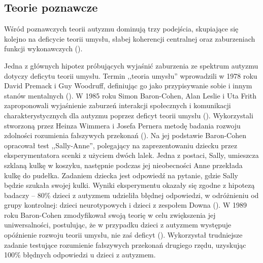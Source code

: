     \subsection{Teorie poznawcze}
    Wśród poznawczych teorii autyzmu dominują trzy podejścia, skupiające się kolejno na deficycie teorii umysłu, słabej koherencji centralnej oraz zaburzeniach funkcji wykonawczych (\cite{rajendran2007cognitive}).
    
    Jedna z głównych hipotez próbujących wyjaśnić zaburzenia ze spektrum autyzmu dotyczy deficytu teorii umysłu. Termin ,,teoria umysłu'' wprowadzili w 1978 roku David Premack i Guy Woodruff, definiując go jako przypisywanie sobie i innym stanów mentalnych (\cite{premack1978does}).
    W 1985 roku Simon Baron-Cohen, Alan Leslie i Uta Frith zaproponowali wyjaśnienie zaburzeń interakcji społecznych i komunikacji charakterystycznych dla autyzmu poprzez deficyt teorii umysłu (\cite{baron1985does}).
    Wykorzystali stworzoną przez Heinza Wimmera i Josefa Pernera metodę badania rozwoju zdolności rozumienia fałszywych przekonań (\cite{wimmer1983beliefs}).
    Na jej podstawie Baron-Cohen opracował test ,,Sally-Anne'', polegający na zaprezentowaniu dziecku przez eksperymentatora scenki z użyciem dwóch lalek.
    Jedna z postaci, Sally, umieszcza szklaną kulkę w koszyku, następnie podczas jej nieobecności Anne przekłada kulkę do pudełka.
    Zadaniem dziecka jest odpowiedź na pytanie, gdzie Sally będzie szukała swojej kulki.
    Wyniki eksperymentu okazały się zgodne z hipotezą badaczy -- 80\% dzieci z autyzmem udzieliła błędnej odpowiedzi, w odróżnieniu od grupy kontrolnej: dzieci neurotypowych i dzieci z zespołem Downa (\cite{baron1985does}).
    W 1989 roku Baron-Cohen zmodyfikował swoją teorię w celu zwiększenia jej uniwersalności, postulując, że w przypadku dzieci z autyzmem występuje opóźnienie rozwoju teorii umysłu, nie zaś deficyt (\cite{baron1989autistic}).
    Wykorzystał trudniejsze zadanie testujące rozumienie fałszywych przekonań drugiego rzędu, uzyskując 100\% błędnych odpowiedzi u dzieci z autyzmem.
    
